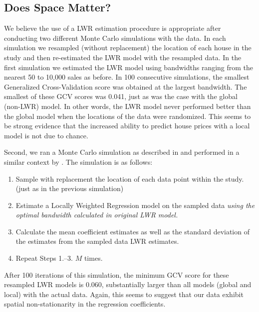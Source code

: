 \documentclass{article}\usepackage{graphicx, color}
\begin{document}
\subsection{Does Space Matter?}
We believe the use of a LWR estimation procedure is appropriate after conducting two different Monte Carlo simulations with the data. In each simulation we resampled (without replacement) the location of each house in the study and then re-estimated the LWR model with the resampled data. In the first simulation we estimated the LWR model using bandwidths ranging from the nearest 50 to 10,000 sales as before. In 100 consecutive simulations, the smallest Generalized Cross-Validation score was obtained at the largest bandwidth. The smallest of these GCV scores was 0.041, just as was the case with the global (non-LWR) model. In other words, the LWR model never performed better than the global model when the locations of the data were randomized. This seems to be strong evidence that the increased ability to predict house prices with a local model is not due to chance. 

Second, we ran a Monte Carlo simulation as described in \citet{Fotheringham2002} and performed in a similar context by \citet{MarmolejoDuarteCarlos;GonzalezTamez2009}. The simulation is as follows:
\begin{enumerate}
\item Sample with replacement the location of each data point within the study. (just as in the previous simulation)
\item Estimate a Locally Weighted Regression model on the sampled data \emph{using the optimal bandwidth calculated in original LWR model.}
\item Calculate the mean coefficient estimates as well as the standard deviation of the estimates from the sampled data LWR estimates.
\item Repeat Steps 1.--3. $M$ times.
\end{enumerate}
After 100 iterations of this simulation, the minimum GCV score for these resampled LWR models is 0.060, substantially larger than all models (global and local) with the actual data. Again, this seems to suggest that our data exhibit spatial non-stationarity in the regression coefficients.
\end{document}
